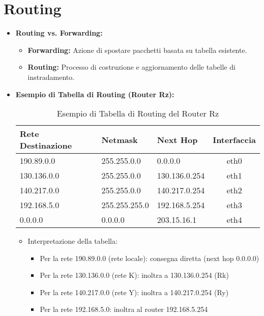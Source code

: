 \section{Routing}
\begin{itemize}
    \item \textbf{Routing vs. Forwarding:}
    \begin{itemize}
        \item \textbf{Forwarding:} Azione di spostare pacchetti basata su tabella esistente.
        \item \textbf{Routing:} Processo di costruzione e aggiornamento delle tabelle di instradamento.
    \end{itemize}
    \item \textbf{Esempio di Tabella di Routing (Router Rz):}
    \begin{table}[H]
        \centering
        \begin{tabular}{|l|l|l|c|}
            \hline
            \textbf{Rete Destinazione} & \textbf{Netmask} & \textbf{Next Hop} & \textbf{Interfaccia} \\
            \hline
            190.89.0.0 & 255.255.0.0 & 0.0.0.0 & eth0 \\
            \hline
            130.136.0.0 & 255.255.0.0 & 130.136.0.254 & eth1 \\
            \hline
            140.217.0.0 & 255.255.0.0 & 140.217.0.254 & eth2 \\
            \hline
            192.168.5.0 & 255.255.255.0 & 192.168.5.254 & eth3 \\
            \hline
            0.0.0.0 & 0.0.0.0 & 203.15.16.1 & eth4 \\
            \hline
        \end{tabular}
        \caption{Esempio di Tabella di Routing del Router Rz}
    \end{table}
    \begin{itemize}
        \item Interpretazione della tabella:
        \begin{itemize}
            \item Per la rete 190.89.0.0 (rete locale): consegna diretta (next hop 0.0.0.0)
            \item Per la rete 130.136.0.0 (rete K): inoltra a 130.136.0.254 (Rk)
            \item Per la rete 140.217.0.0 (rete Y): inoltra a 140.217.0.254 (Ry)
            \item Per la rete 192.168.5.0: inoltra al router 192.168.5.254

\end{itemize}
\end{itemize}
\end{itemize}
